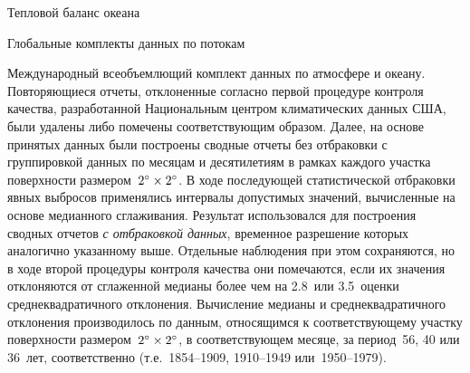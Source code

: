 \begin{chapter}{Тепловой баланс океана}
\begin{section}{Глобальные комплекты данных по потокам}
\begin{paragraph}{Международный всеобъемлющий комплект данных по атмосфере 
и океану.}
Повторяющиеся отчеты, отклоненные согласно первой процедуре%
контроля качества, разработанной Национальным центром климатических данных США, 
были удалены либо помечены соответствующим образом. Далее, на основе принятых 
данных были построены сводные отчеты без отбраковки с группировкой данных 
по месяцам и десятилетиям в рамках каждого участка поверхности 
размером~${2}^\circ\times{2}^\circ$. В ходе последующей статистической 
отбраковки явных выбросов применялись интервалы допустимых значений, 
вычисленные на основе медианного сглаживания.
Результат использовался для построения сводных отчетов 
\emph{с отбраковкой данных}, временное разрешение которых аналогично 
указанному выше. Отдельные наблюдения при этом сохраняются, но в ходе второй
процедуры контроля качества они помечаются, если их значения отклоняются 
от сглаженной медианы более чем на 2.8~или 3.5~оценки среднеквадратичного 
отклонения. Вычисление медианы и среднеквадратичного отклонения производилось 
по данным, относящимся к соответствующему участку поверхности 
размером~${2}^\circ\times{2}^\circ$, в соответствующем месяце, за 
период~56, 40 или 36~лет, соответственно 
(т.е.~1854--1909, 1910--1949 или~1950--1979).
%


\end{paragraph}
\end{section}
\end{chapter}
